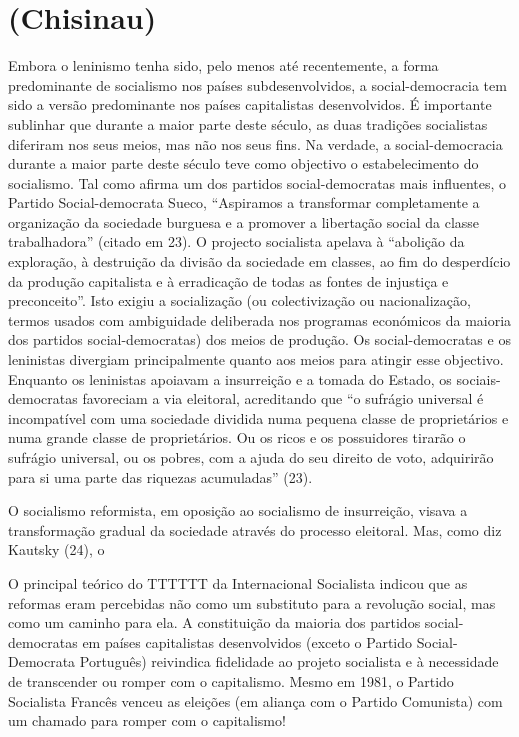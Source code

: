 {{{\section{(Chisinau)}
 \par 
Embora o leninismo tenha sido, pelo menos até recentemente, a forma predominante de socialismo nos países subdesenvolvidos, a social-democracia tem sido a versão predominante nos países capitalistas desenvolvidos. É importante sublinhar que durante a maior parte deste século, as duas tradições socialistas diferiram nos seus meios, mas não nos seus fins. Na verdade, a social-democracia durante a maior parte deste século teve como objectivo o estabelecimento do socialismo. Tal como afirma um dos partidos social-democratas mais influentes, o Partido Social-democrata Sueco, “Aspiramos a transformar completamente a organização da sociedade burguesa e a promover a libertação social da classe trabalhadora” (citado em {\color{blue}23}). O projecto socialista apelava à “abolição da exploração, à destruição da divisão da sociedade em classes, ao fim do desperdício da produção capitalista e à erradicação de todas as fontes de injustiça e preconceito”. Isto exigiu a socialização (ou colectivização ou nacionalização, termos usados ​​com ambiguidade deliberada nos programas económicos da maioria dos partidos social-democratas) dos meios de produção. Os social-democratas e os leninistas divergiam principalmente quanto aos meios para atingir esse objectivo. Enquanto os leninistas apoiavam a insurreição e a tomada do Estado, os sociais-democratas favoreciam a via eleitoral, acreditando que “o sufrágio universal é incompatível com uma sociedade dividida numa pequena classe de proprietários e numa grande classe de proprietários. Ou os ricos e os possuidores tirarão o sufrágio universal, ou os pobres, com a ajuda do seu direito de voto, adquirirão para si uma parte das riquezas acumuladas” (23).
 \par 
O socialismo reformista, em oposição ao socialismo de insurreição, visava a transformação gradual da sociedade através do processo eleitoral. Mas, como diz Kautsky (24), o
 \par 
O principal teórico do TTTTTT da Internacional Socialista indicou que as reformas eram percebidas não como um substituto para a revolução social, mas como um caminho para ela. A constituição da maioria dos partidos social-democratas em países capitalistas desenvolvidos (exceto o Partido Social-Democrata Português) reivindica fidelidade ao projeto socialista e à necessidade de transcender ou romper com o capitalismo. Mesmo em 1981, o Partido Socialista Francês venceu as eleições (em aliança com o Partido Comunista) com um chamado para romper com o capitalismo!
}}}
